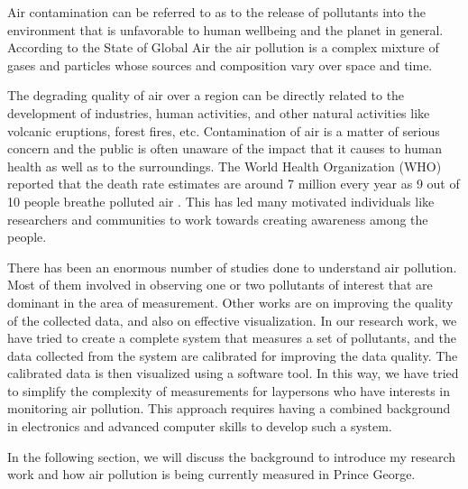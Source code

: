  Air contamination can be referred to as to the release of pollutants into the environment that is unfavorable to human wellbeing and the planet in general. According to the State of Global Air \cite{HealthEffectsInstitute2017}  the air pollution is a complex mixture of gases and particles whose sources and composition vary over space and time. 
 
 
 The degrading quality of air over a region can be directly related to the development of industries, human activities, and other natural activities like volcanic eruptions, forest fires, etc. Contamination of air is a matter of serious concern and the public is often unaware of the impact that it causes to human health as well as to the surroundings. The World Health Organization (WHO) reported that the death rate estimates are around 7 million every year as 9 out of 10 people breathe polluted air \cite{Wolman1985}. This has led many motivated individuals like researchers and communities to work towards creating awareness among the people.
 
 There has been an enormous number of studies done to understand air pollution. Most of them involved in observing one or two pollutants of interest that are dominant in the area of measurement. Other works are on  improving the quality of the collected data, and also on effective visualization. In our research work, we have tried to create a complete system that measures a set of pollutants, and the data collected from the system are calibrated for improving the data quality. The calibrated data is then visualized using a software tool. In this way, we have tried to simplify the complexity of measurements for laypersons who have interests in monitoring air pollution. This approach requires having a combined background in electronics and advanced computer skills to develop such a system. 
 
 In the following section, we will discuss the background to introduce my research work and how air pollution is being currently measured in Prince George.
 
 



